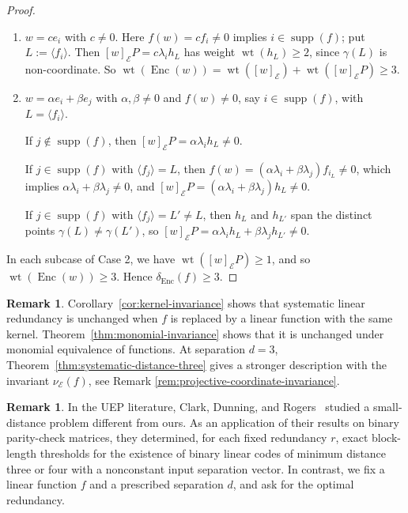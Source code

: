 \documentclass[a4paper,12pt]{article}
\theoremstyle{plain}
\theoremstyle{definition}
\newtheorem{remark}[lemma]{Remark}
\newcommand{\wt}{\operatorname{wt}}
\newcommand{\Enc}{\operatorname{Enc}}
\begin{document}
\begin{proof}
\begin{enumerate}[wide=0pt, leftmargin=*, label=Case~\arabic*:]

\item $w=ce_i$ with $c\neq0$. Here $f(w)=cf_i\neq0$ implies
$i\in\operatorname{supp}(f)$; put $L:=\langle f_i\rangle$. Then
$[w]_{\mathcal E}P=c\lambda_ih_L$ has weight $\wt(h_L)\geq2$, since
$\gamma(L)$ is non-coordinate. So
$\wt(\Enc(w))=\wt([w]_{\mathcal E})+\wt([w]_{\mathcal E}P)\geq3$.

\item  $w=\alpha e_i+\beta e_j$ with $\alpha,\beta\neq0$ and
$f(w)\neq0$, say $i\in\operatorname{supp}(f)$, with
$L=\langle f_i\rangle$. 

If $j\notin\operatorname{supp}(f)$, then
$[w]_{\mathcal E}P=\alpha\lambda_ih_L\neq0$.

If
$j\in\operatorname{supp}(f)$ with $\langle f_j\rangle=L$, then
$f(w)=(\alpha\lambda_i+\beta\lambda_j)f_{i_L}\neq0$, which implies
$\alpha\lambda_i+\beta\lambda_j\neq0$, and
$[w]_{\mathcal E}P=(\alpha\lambda_i+\beta\lambda_j)h_L\neq0$. 

If
$j\in\operatorname{supp}(f)$ with
$\langle f_j\rangle=L'\neq L$, then $h_L$ and $h_{L'}$ span the
distinct points $\gamma(L)\neq\gamma(L')$, so
$[w]_{\mathcal E}P=\alpha\lambda_ih_L+\beta\lambda_j h_{L'}\neq0$.
\end{enumerate} 
In each subcase of Case 2, we have $\wt([w]_{\mathcal E}P) \ge 1$, and so $\wt(\Enc(w)) \ge 3$. Hence $\delta_{\Enc}(f)\geq3$.
\end{proof}

\begin{remark}
Corollary~\ref{cor:kernel-invariance} shows that systematic linear
redundancy is unchanged when $f$ is replaced by a linear function
with the same kernel.
Theorem~\ref{thm:monomial-invariance} shows that it is unchanged
under monomial equivalence of functions. 
At separation $d=3$,
Theorem~\ref{thm:systematic-distance-three} gives a stronger description with the invariant $\nu_{\mathcal E}(f)$, see Remark \ref{rem:projective-coordinate-invariance}.
\end{remark}

\begin{remark}
\label{rem:clark-small-distance} 
In the UEP literature, 
Clark, Dunning, and Rogers~\cite{clark1990} studied a small-distance problem different from ours. 
As an application of their results on binary parity-check matrices,
they determined, for each fixed redundancy $r$, exact block-length
thresholds for the existence of binary linear codes of minimum
distance three or four with a nonconstant input separation vector.
In contrast, we fix a linear function $f$ and a prescribed
separation $d$, and ask for the optimal redundancy.
\end{remark}
\end{document}
